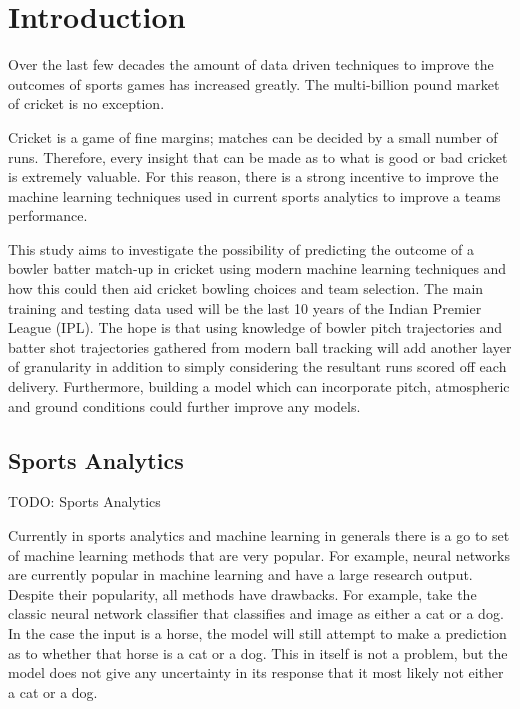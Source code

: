 \documentclass[12pt,a4paper]{report}
\theoremstyle{definition}
\begin{document}
\newpage
\setcounter{page}{1}

\chapter{Introduction}

Over the last few decades the amount of data driven techniques to improve the outcomes of sports games has increased greatly. 
The multi-billion pound market of cricket is no exception. 

Cricket is a game of fine margins; matches can be decided by a small number of runs.
Therefore, every insight that can be made as to what is good or bad cricket is extremely valuable.
For this reason, there is a strong incentive to improve the machine learning techniques used in current sports analytics to improve a teams performance.

This study aims to investigate the possibility of predicting the outcome of a bowler batter match-up in cricket using modern machine learning techniques and how this could then aid cricket bowling choices and team selection. 
The main training and testing data used will be the last 10 years of the Indian Premier League (IPL).
The hope is that using knowledge of bowler pitch trajectories and batter shot trajectories gathered from modern ball tracking will add another layer of granularity in addition to simply considering the resultant runs scored off each delivery. 
Furthermore, building a model which can incorporate pitch, atmospheric and ground conditions could further improve any models. 

\section{Sports Analytics}

TODO: Sports Analytics

Currently in sports analytics and machine learning in generals there is a go to set of machine learning methods that are very popular.
For example, neural networks are currently popular in machine learning and have a large research output.
Despite their popularity, all methods have drawbacks.
For example, take the classic neural network classifier that classifies and image as either a cat or a dog.
In the case the input is a horse, the model will still attempt to make a prediction as to whether that horse is a cat or a dog.
This in itself is not a problem, but the model does not give any uncertainty in its response that it most likely not either a cat or a dog. 
\end{document}
